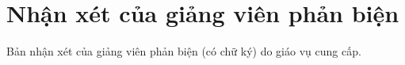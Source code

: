 \chapter*{Nhận xét của giảng viên phản biện}
\label{reviewer}

Bản nhận xét của giảng viên phản biện (có chữ ký) do giáo vụ cung cấp.
